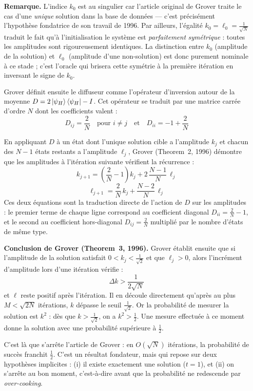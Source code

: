 \documentclass{ceri/sty/rapport}
\begin{document}
\medskip
\noindent\textbf{Remarque.}
L'indice $k_0$ est au singulier car l'article original de Grover traite le cas d'une \emph{unique} solution dans la base de données --- c'est précisément l'hypothèse fondatrice de son travail de 1996.
Par ailleurs, l'égalité $k_0 = \ell_0 = \frac{1}{\sqrt{N}}$ traduit le fait qu'à l'initialisation le système est \emph{parfaitement symétrique} : toutes les amplitudes sont rigoureusement identiques.
La distinction entre $k_0$ (amplitude de la solution) et $\ell_0$ (amplitude d'une non-solution) est donc purement nominale à ce stade ; c'est l'oracle qui brisera cette symétrie à la première itération en inversant le signe de $k_0$.

Grover définit ensuite le diffuseur comme l'opérateur d'inversion autour de la moyenne $D = 2\ket{\psi_H}\bra{\psi_H} - I$. Cet opérateur se traduit par une matrice carrée d'ordre $N$ dont les coefficients valent :
\[
D_{ij} = \frac{2}{N} \quad \text{pour } i \neq j \quad \text{et} \quad D_{ii} = -1 + \frac{2}{N}
\]

En appliquant $D$ à un état dont l'unique solution cible a l'amplitude $k_j$ et chacun des $N-1$ états restants a l'amplitude $\ell_j$, Grover (Theorem~2, 1996) démontre que les amplitudes à l'itération suivante vérifient la récurrence :
\[
k_{j+1} = \left(\frac{2}{N} - 1\right)k_j + 2\,\frac{N-1}{N}\,\ell_j
\]
\[
\ell_{j+1} = \frac{2}{N}\,k_j + \frac{N-2}{N}\,\ell_j
\]
Ces deux équations sont la traduction directe de l'action de $D$ sur les amplitudes : le premier terme de chaque ligne correspond au coefficient diagonal $D_{ii} = \frac{2}{N}-1$, et le second au coefficient hors-diagonal $D_{ij} = \frac{2}{N}$ multiplié par le nombre d'états de même type.

\medskip\noindent\textbf{Conclusion de Grover (Theorem~3, 1996).}
Grover établit ensuite que si l'amplitude de la solution satisfait $0 < k_j < \frac{1}{\sqrt{2}}$ et que $\ell_j > 0$, alors l'incrément d'amplitude lors d'une itération vérifie :
\[
\Delta k > \frac{1}{2\sqrt{N}}
\]
et $\ell$ reste positif après l'itération. Il en découle directement qu'après au plus $M < \sqrt{2N}$ itérations, $k$ dépasse le seuil $\frac{1}{\sqrt{2}}$.
Or la probabilité de mesurer la solution est $k^2$ : dès que $k > \frac{1}{\sqrt{2}}$, on a $k^2 > \frac{1}{2}$.
Une mesure effectuée à ce moment donne la solution avec une probabilité supérieure à $\frac{1}{2}$.

C'est là que s'arrête l'article de Grover : en $O(\sqrt{N})$ itérations, la probabilité de succès franchit $\frac{1}{2}$. C'est un résultat fondateur, mais qui repose sur deux hypothèses implicites : (i) il existe exactement une solution ($t = 1$), et (ii) on s'arrête au bon moment, c'est-à-dire avant que la probabilité ne redescende par \emph{over-cooking}.
\end{document}
